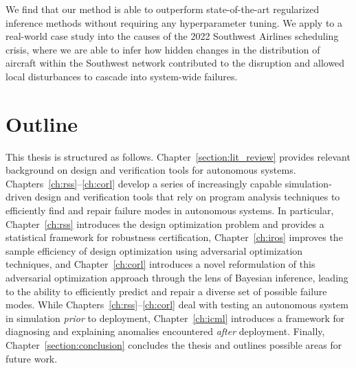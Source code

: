 We find that our method is able to outperform state-of-the-art regularized inference methods without requiring any hyperparameter tuning. We apply \ouralg{} to a real-world case study into the causes of the 2022 Southwest Airlines scheduling crisis, where we are able to infer how hidden changes in the distribution of aircraft within the Southwest network contributed to the disruption and allowed local disturbances to cascade into system-wide failures.



\section{Outline}

This thesis is structured as follows. Chapter~\ref{section:lit_review} provides relevant background on design and verification tools for autonomous systems. Chapters~\ref{ch:rss}--\ref{ch:corl} develop a series of increasingly capable simulation-driven design and verification tools that rely on program analysis techniques to efficiently find and repair failure modes in autonomous systems. In particular, Chapter~\ref{ch:rss} introduces the design optimization problem and provides a statistical framework for robustness certification, Chapter~\ref{ch:iros} improves the sample efficiency of design optimization using adversarial optimization techniques, and Chapter~\ref{ch:corl} introduces a novel reformulation of this adversarial optimization approach through the lens of Bayesian inference, leading to the ability to efficiently predict and repair a diverse set of possible failure modes. While Chapters~\ref{ch:rss}--\ref{ch:corl} deal with testing an autonomous system in simulation \textit{prior} to deployment, Chapter~\ref{ch:icml} introduces a framework for diagnosing and explaining anomalies encountered \textit{after} deployment. Finally, Chapter~\ref{section:conclusion} concludes the thesis and outlines possible areas for future work.